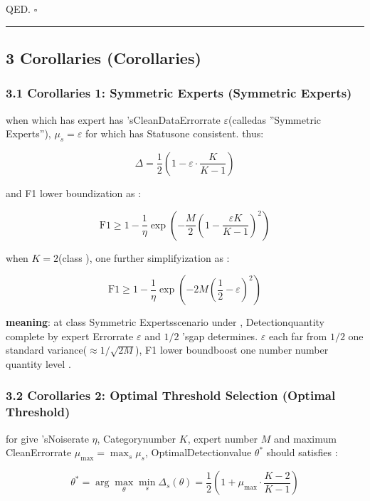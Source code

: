 \documentclass[
  12pt,
]{article}
\begin{document}
QED. \(\square\)

\begin{center}\rule{0.5\linewidth}{0.5pt}\end{center}

\subsection{3 Corollaries (Corollaries)}\label{ux63a8ux8bba-corollaries}

\subsubsection{3.1 Corollaries 1: Symmetric Experts (Symmetric
Experts)}\label{ux63a8ux8bba-1ux5bf9ux79f0ux4e13ux5bb6-symmetric-experts}

when which has expert has 'sCleanDataErrorrate 
\(\varepsilon\)(calledas ''Symmetric Experts''), \(\mu_s = \varepsilon\)
for which has Statusone consistent. thus: 

\[\Delta = \frac{1}{2}\left(1 - \varepsilon \cdot \frac{K}{K-1}\right)\]

and  F1 lower boundization as : 

\[\text{F1} \geq 1 - \frac{1}{\eta} \exp\!\left(-\frac{M}{2}\left(1 - \frac{\varepsilon K}{K-1}\right)^2\right)\]

when  \(K = 2\)(class ), one further simplifyization as : 

\[\text{F1} \geq 1 - \frac{1}{\eta} \exp\!\left(-2M\left(\frac{1}{2} - \varepsilon\right)^2\right)\]

\textbf{meaning}: at class Symmetric Expertsscenario under , Detectionquantity complete by expert Errorrate 
\(\varepsilon\) and  \(1/2\) 'sgap determines. \(\varepsilon\) each far from \(1/2\)
one standard variance(\(\approx 1/\sqrt{2M}\)), F1 lower boundboost one number number quantity level . 

\subsubsection{3.2 Corollaries 2: Optimal Threshold Selection (Optimal
Threshold)}\label{ux63a8ux8bba-2ux6700ux4f18ux9608ux503cux9009ux62e9-optimal-threshold}

for give 'sNoiserate  \(\eta\), Categorynumber  \(K\), expert number  \(M\) and maximum CleanErrorrate 
\(\mu_{\max} = \max_s \mu_s\), OptimalDetectionvalue  \(\theta^*\) should satisfies : 

\[\theta^* = \arg\max_\theta \min_s \Delta_s(\theta) = \frac{1}{2}\left(1 + \mu_{\max} \cdot \frac{K-2}{K-1}\right)\]
\end{document}
